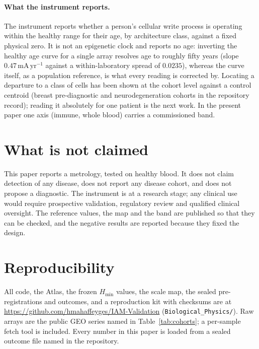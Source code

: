 \documentclass[12pt,a4paper]{article}
\begin{document}
\paragraph{What the instrument reports.} The instrument reports whether a person's cellular write process is operating within the healthy range for their age, by architecture class, against a fixed physical zero. It is not an epigenetic clock and reports no age: inverting the healthy age curve for a single array resolves age to roughly fifty years (slope $0.47\,\mathrm{mA\,yr^{-1}}$ against a within-laboratory spread of $0.0235$), whereas the curve itself, as a population reference, is what every reading is corrected by. Locating a departure to a class of cells has been shown at the cohort level against a control centroid (breast pre-diagnostic and neurodegeneration cohorts in the repository record); reading it absolutely for one patient is the next work. In the present paper one axis (immune, whole blood) carries a commissioned band.

\section{What is not claimed}
This paper reports a metrology, tested on healthy blood. It does not claim detection of any disease, does not report any disease cohort, and does not propose a diagnostic. The instrument is at a research stage; any clinical use would require prospective validation, regulatory review and qualified clinical oversight. The reference values, the map and the band are published so that they can be checked, and the negative results are reported because they fixed the design.

\section{Reproducibility}
All code, the Atlas, the frozen $H_{\min}$ values, the scale map, the sealed pre-registrations and outcomes, and a reproduction kit with checksums are at \url{https://github.com/hmahaffeyges/IAM-Validation} (\texttt{Biological\_Physics/}). Raw arrays are the public GEO series named in Table~\ref{tab:cohorts}; a per-sample fetch tool is included. Every number in this paper is loaded from a sealed outcome file named in the repository.
\end{document}
